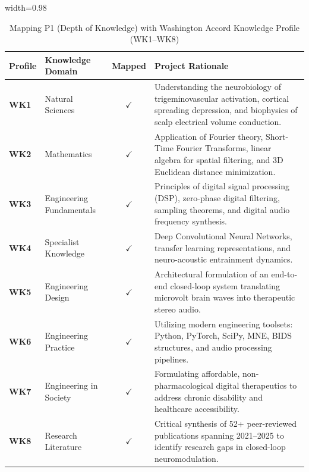 \documentclass[12pt, a4paper]{report}
\begin{document}
\begin{table}[htbp]
\centering
\caption{Mapping P1 (Depth of Knowledge) with Washington Accord Knowledge Profile (WK1--WK8)}
\label{tab:knowledge_profile}
\begin{adjustbox}{width=0.98\textwidth}
\begin{tabular}{p{}p{}cp{}}
\toprule
\textbf{Profile} & \textbf{Knowledge Domain} & \textbf{Mapped} & \textbf{Project Rationale} \\
\midrule
\textbf{WK1} & Natural Sciences & $\checkmark$ & Understanding the neurobiology of trigeminovascular activation, cortical spreading depression, and biophysics of scalp electrical volume conduction. \\
\textbf{WK2} & Mathematics & $\checkmark$ & Application of Fourier theory, Short-Time Fourier Transforms, linear algebra for spatial filtering, and 3D Euclidean distance minimization. \\
\textbf{WK3} & Engineering Fundamentals & $\checkmark$ & Principles of digital signal processing (DSP), zero-phase digital filtering, sampling theorems, and digital audio frequency synthesis. \\
\textbf{WK4} & Specialist Knowledge & $\checkmark$ & Deep Convolutional Neural Networks, transfer learning representations, and neuro-acoustic entrainment dynamics. \\
\textbf{WK5} & Engineering Design & $\checkmark$ & Architectural formulation of an end-to-end closed-loop system translating microvolt brain waves into therapeutic stereo audio. \\
\textbf{WK6} & Engineering Practice & $\checkmark$ & Utilizing modern engineering toolsets: Python, PyTorch, SciPy, MNE, BIDS structures, and audio processing pipelines. \\
\textbf{WK7} & Engineering in Society & $\checkmark$ & Formulating affordable, non-pharmacological digital therapeutics to address chronic disability and healthcare accessibility. \\
\textbf{WK8} & Research Literature & $\checkmark$ & Critical synthesis of 52+ peer-reviewed publications spanning 2021--2025 to identify research gaps in closed-loop neuromodulation. \\
\bottomrule
\end{tabular}
\end{adjustbox}
\end{table}
\end{document}
